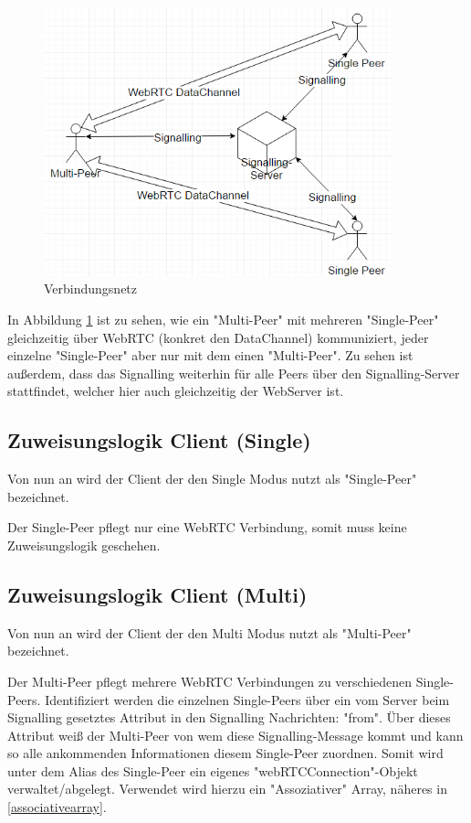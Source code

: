 \begin{figure}[htH]
\centering
\includegraphics[width=0.9\textwidth]{backend/ConnectionBetweenPeers.PNG}
\caption{Verbindungsnetz}
\label{backfig1}
\end{figure}

In Abbildung \ref{backfig1} ist zu sehen, wie ein "Multi-Peer" mit mehreren 
"Single-Peer" gleichzeitig über WebRTC (konkret den DataChannel) kommuniziert, 
jeder einzelne "Single-Peer" aber nur mit dem einen "Multi-Peer". Zu sehen ist 
außerdem, dass das Signalling weiterhin für alle Peers über den 
Signalling-Server stattfindet, welcher hier auch gleichzeitig der WebServer ist.



\subsection{Zuweisungslogik Client (Single)}
Von nun an wird der Client der den Single Modus nutzt als "Single-Peer" 
bezeichnet.

Der Single-Peer pflegt nur eine WebRTC Verbindung, somit muss keine 
Zuweisungslogik geschehen.



\subsection{Zuweisungslogik Client (Multi)}
Von nun an wird der Client der den Multi Modus nutzt als "Multi-Peer" 
bezeichnet.


Der Multi-Peer pflegt mehrere WebRTC Verbindungen zu verschiedenen Single-Peers. 
Identifiziert werden die einzelnen Single-Peers über ein vom Server beim 
Signalling gesetztes Attribut in den Signalling Nachrichten: "from". Über dieses 
Attribut weiß der Multi-Peer von wem diese Signalling-Message kommt und kann so 
alle ankommenden Informationen diesem Single-Peer zuordnen. Somit wird unter dem 
Alias des Single-Peer ein eigenes "webRTCConnection"-Objekt verwaltet/abgelegt.
Verwendet wird hierzu ein "Assoziativer" Array, näheres in \ref{associativearray}.



